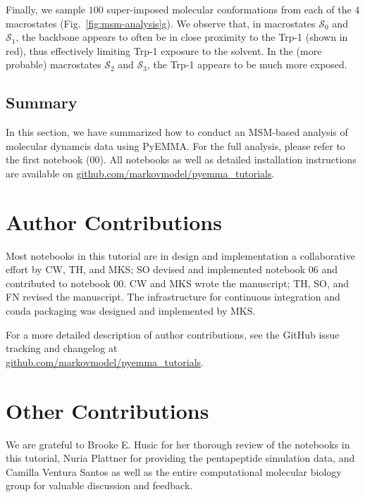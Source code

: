 \documentclass[9pt,tutorial]{livecoms}
\newcommand{\githubrepository}{\url{github.com/markovmodel/pyemma_tutorials}}
\begin{document}
Finally, we sample $100$ super-imposed molecular conformations from each of the $4$ macrostates (Fig.~\ref{fig:msm-analysis}g). We observe that, in macrostates $\mathcal{S}_0$ and $\mathcal{S}_1$, the backbone appears to often be in close proximity to the Trp-1 (shown in red), thus effectively limiting Trp-1 exposure to the solvent. In the (more probable) macrostates $\mathcal{S}_2$ and $\mathcal{S}_3$, the Trp-1 appears to be much more exposed.

\subsection{Summary}

In this section, we have summarized how to conduct an MSM-based analysis of molecular dynamcis data using PyEMMA. For the full analysis, please refer to the first notebook (00). All notebooks as well as detailed installation instructions are available on \githubrepository{}.

\section{Author Contributions}
%
Most notebooks in this tutorial are in design and implementation a collaborative effort by CW, TH, and MKS; SO devised and implemented notebook 06 and contributed to notebook 00. CW and MKS wrote the manuscript; TH, SO, and FN revised the manuscript. The infrastructure for continuous integration and conda packaging was designed and implemented by MKS.

For a more detailed description of author contributions, see the GitHub issue tracking and changelog at\\\githubrepository{}.

\section{Other Contributions}
%
We are grateful to Brooke E. Husic for her thorough review of the notebooks in this tutorial, Nuria Plattner for providing the pentapeptide simulation data, and Camilla Ventura Santos as well as the entire computational molecular biology group for valuable discussion and feedback.
\end{document}
